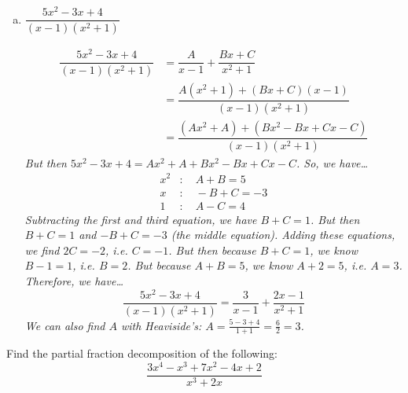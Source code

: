 \documentclass[11pt,letterpaper]{article}
\begin{document}
\begin{enumerate}[(a)]
	
	
	\newpage
	
	
	
	\item $\dfrac{5x^2 - 3x + 4}{(x - 1)(x^2 + 1)}$ 
	
		\[
		\begin{aligned}
		\dfrac{5x^2 - 3x + 4}{(x - 1)(x^2 + 1)}&= \dfrac{A}{x - 1} + \dfrac{Bx + C}{x^2 + 1} \\[0.3cm]
		&= \dfrac{A(x^2 + 1) + (Bx + C)(x - 1)}{(x - 1)(x^2 + 1)} \\[0.3cm]
		&=\dfrac{(Ax^2 + A) + (Bx^2 - Bx + Cx - C)}{(x - 1)(x^2 + 1)}
		\end{aligned}
		\]
	{\itshape But then $5x^2 - 3x + 4= Ax^2 + A + Bx^2 - Bx + Cx - C$. So, we have\dots}
		\[
		\begin{aligned}
		x^2 &\colon\quad A + B= 5 \\
		x &\colon\quad -B + C= -3 \\
		1 &\colon\quad A - C= 4
		\end{aligned}
		\]
	{\itshape Subtracting the first and third equation, we have $B + C= 1$. But then $B + C= 1$ and $-B + C= -3$ (the middle equation). Adding these equations, we find $2C= -2$, i.e. $C= -1$. But then because $B + C= 1$, we know $B - 1= 1$, i.e. $B= 2$. But because $A + B= 5$, we know $A + 2= 5$, i.e. $A= 3$. Therefore, we have\dots}
		\[
		\boxed{\dfrac{5x^2 - 3x + 4}{(x - 1)(x^2 + 1)}= \dfrac{3}{x - 1} + \dfrac{2x - 1}{x^2 + 1}}
		\]
	{\itshape We can also find $A$ with Heaviside's: $A= \tfrac{5 - 3 + 4}{1 + 1}= \tfrac{6}{2}= 3$.}
	\end{enumerate}



\newpage



 Find the partial fraction decomposition of the following:
	\[
	\dfrac{3x^4 - x^3 + 7x^2 - 4x + 2}{x^3 + 2x}
	\] \par\vspace{0.3cm}
\end{document}
